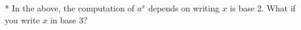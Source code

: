 *
  In the above, the computation of $a^x$ depends on writing $x$ is base 2.
  What if you write $x$ in base 3?
